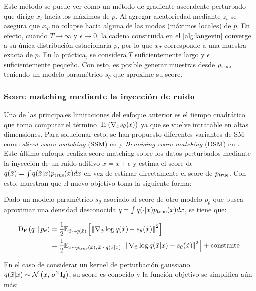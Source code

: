 Este método se puede ver como un método de gradiente ascendente perturbado que dirige $x_t$ hacia los máximos de $p$. Al agregar aleatoriedad mediante $z_t$ se asegura que $x_T$ no colapse hacia alguna de las modas (máximos locales) de $p$. En efecto, cuando $T\to\infty$ y $\epsilon\to 0$, la cadena construida en el \autoref{alg:langevin} converge a su única distribución estacionaria $p$, por lo que $x_T$ corresponde a una muestra exacta de $p$. En la práctica, se considera $T$ suficientemente largo y $\epsilon$ suficientemente pequeño. Con esto, es posible generar muestras desde $p_{\operatorname{true}}$ teniendo un modelo paramétrico $s_\theta$ que aproxime su score.

\subsubsection{Score matching mediante la inyección de ruido}

Una de las principales limitaciones del enfoque anterior es el tiempo cuadrático que toma computar el término $\operatorname{Tr}\left(\nabla_x s_\theta(x)\right)$ ya que se vuelve intratable en altas dimensiones. Para solucionar esto, se han propuesto diferentes variantes de SM como \textit{sliced score matching} (SSM) en \cite{song2019sliced} y \textit{Denoising score matching} (DSM) en \cite{DSM}. Este último enfoque realiza score matching sobre los datos perturbados mediante la inyección de un ruido aditivo $\tilde{x} = x+\epsilon$ y estima el score de $q(\tilde{x})=\int q(\tilde{x}|x)p_{\operatorname{true}}(x)dx$ en vez de estimar directamente el score de $p_{\operatorname{true}}$. Con esto, muestran que el nuevo objetivo toma la siguiente forma:

\begin{prop}
    Dado un modelo paramétrico $s_\theta$ asociado al score de otro modelo $p_\theta$ que busca aproximar una densidad desconocida $q=\int q(\cdot|x)p_{\operatorname{true}}(x)dx$, se tiene que:

    \begin{align}
        \operatorname{D_F}\left(q\,\|\,p_\theta\right) & = \frac{1}{2}\mathbb{E}_{\tilde{x}\sim q(\tilde{x})}\left[\left\lVert \nabla_{\tilde{x}}\log q(\tilde{x}) - s_\theta(\tilde{x}) \right\rVert^2\right]                             \\
                         & = \frac{1}{2}\mathbb{E}_{x\sim p_{\operatorname{true}}(x),\,\tilde{x}\sim q(\tilde{x}|x)}\left[\left\lVert \nabla_{\tilde{x}}\log q(\tilde{x}|x) - s_\theta(\tilde{x}) \right\rVert^2\right] + \operatorname{constante}
    \end{align}
\end{prop}

En el caso de considerar un kernel de perturbación gaussiano $q(\tilde{x}|x) \sim \mathcal{N}\left(x,\,\sigma^2 \operatorname{I}_{d}\right)$, su score es conocido y la función objetivo se simplifica aún más:

